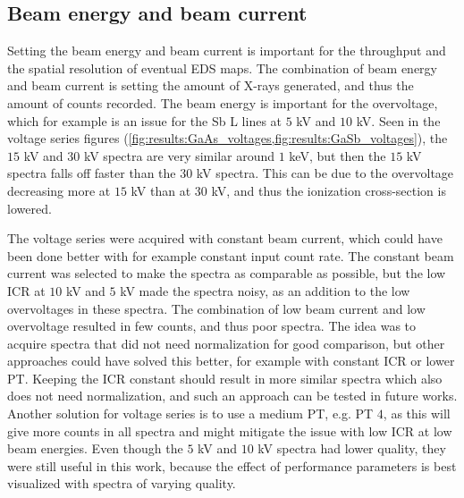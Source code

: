 \subsection{Beam energy and beam current}
\label{discussion:beam_energy_current}

Setting the beam energy and beam current is important for the throughput and the spatial resolution of eventual EDS maps.
The combination of beam energy and beam current is setting the amount of X-rays generated, and thus the amount of counts recorded.
The beam energy is important for the overvoltage, which for example is an issue for the Sb L lines at $5$ kV and $10$ kV.
Seen in the voltage series figures (\cref{fig:results:GaAs_voltages,fig:results:GaSb_voltages}), the $15$ kV and $30$ kV spectra are very similar around $1$ keV, but then the $15$ kV spectra falls off faster than the $30$ kV spectra.
This can be due to the overvoltage decreasing more at $15$ kV than at $30$ kV, and thus the ionization cross-section is lowered.

The voltage series were acquired with constant beam current, which could have been done better with for example constant input count rate.
The constant beam current was selected to make the spectra as comparable as possible, but the low ICR at $10$ kV and $5$ kV made the spectra noisy, as an addition to the low overvoltages in these spectra.
The combination of low beam current and low overvoltage resulted in few counts, and thus poor spectra.
The idea was to acquire spectra that did not need normalization for good comparison, but other approaches could have solved this better, for example with constant ICR or lower PT.
Keeping the ICR constant should result in more similar spectra which also does not need normalization, and such an approach can be tested in future works.
Another solution for voltage series is to use a medium PT, e.g. PT $4$, as this will give more counts in all spectra and might mitigate the issue with low ICR at low beam energies.
Even though the $5$ kV and $10$ kV spectra had lower quality, they were still useful in this work, because the effect of performance parameters is best visualized with spectra of varying quality.



